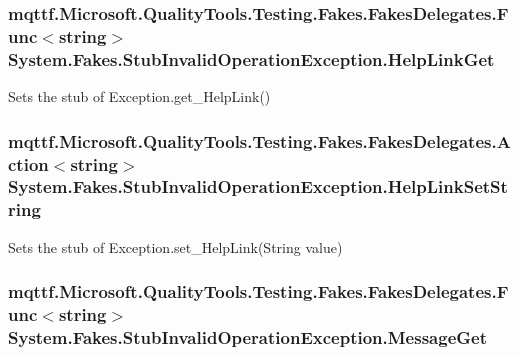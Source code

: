 \hypertarget{class_system_1_1_fakes_1_1_stub_invalid_operation_exception_ab9e80c81bb70d9da891e9202a06fbbba}{
\subsubsection[{Help\-Link\-Get}]{\setlength{\rightskip}{0pt plus 5cm}mqttf.\-Microsoft.\-Quality\-Tools.\-Testing.\-Fakes.\-Fakes\-Delegates.\-Func$<$string$>$ System.\-Fakes.\-Stub\-Invalid\-Operation\-Exception.\-Help\-Link\-Get}}\label{class_system_1_1_fakes_1_1_stub_invalid_operation_exception_ab9e80c81bb70d9da891e9202a06fbbba}


Sets the stub of Exception.\-get\-\_\-\-Help\-Link()

\hypertarget{class_system_1_1_fakes_1_1_stub_invalid_operation_exception_a64f6d935b4d6f7d2f952e6a5b3995c1a}{
\subsubsection[{Help\-Link\-Set\-String}]{\setlength{\rightskip}{0pt plus 5cm}mqttf.\-Microsoft.\-Quality\-Tools.\-Testing.\-Fakes.\-Fakes\-Delegates.\-Action$<$string$>$ System.\-Fakes.\-Stub\-Invalid\-Operation\-Exception.\-Help\-Link\-Set\-String}}\label{class_system_1_1_fakes_1_1_stub_invalid_operation_exception_a64f6d935b4d6f7d2f952e6a5b3995c1a}


Sets the stub of Exception.\-set\-\_\-\-Help\-Link(\-String value)

\hypertarget{class_system_1_1_fakes_1_1_stub_invalid_operation_exception_a3d7af233eb59ecdd4875e1db15316b79}{
\subsubsection[{Message\-Get}]{\setlength{\rightskip}{0pt plus 5cm}mqttf.\-Microsoft.\-Quality\-Tools.\-Testing.\-Fakes.\-Fakes\-Delegates.\-Func$<$string$>$ System.\-Fakes.\-Stub\-Invalid\-Operation\-Exception.\-Message\-Get}}\label{class_system_1_1_fakes_1_1_stub_invalid_operation_exception_a3d7af233eb59ecdd4875e1db15316b79}


